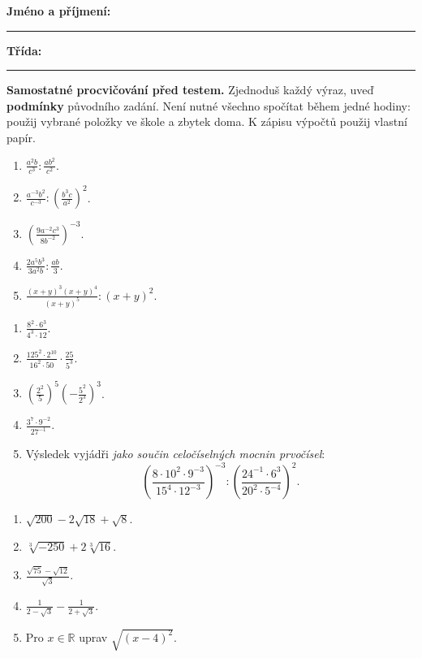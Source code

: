 \documentclass[11pt,a4paper]{article}
\begin{document}
\textbf{Jméno a příjmení:}\ \rule{7cm}{0.3pt}\hfill
\textbf{Třída:}\ \rule{2.1cm}{0.3pt}

\textbf{Samostatné procvičování před testem.}
Zjednoduš každý výraz, uveď \textbf{podmínky} původního zadání.
Není nutné všechno spočítat během jedné hodiny: použij vybrané
položky ve škole a zbytek doma. K zápisu výpočtů použij vlastní papír.

\begin{enumerate}[label=\textbf{\arabic*.},leftmargin=10mm]
\item $\displaystyle\frac{a^2b}{c^3}:\frac{ab^2}{c^2}$.
\item $\displaystyle\frac{a^{-3}b^2}{c^{-3}}:\left(\frac{b^3c}{a^2}\right)^2$.
\item $\displaystyle\left(\frac{9a^{-2}c^3}{8b^{-2}}\right)^{-3}$.
\item $\displaystyle\frac{2a^5b^3}{3a^2b}:\frac{ab}3$.
\item $\displaystyle\frac{(x+y)^3(x+y)^4}{(x+y)^5}:(x+y)^2$.
\end{enumerate}

\begin{enumerate}[label=\textbf{\arabic*.},leftmargin=10mm,start=6]
\item $\displaystyle\frac{8^2\cdot6^3}{4^3\cdot12}$.
\item $\displaystyle\frac{125^2\cdot2^{10}}{16^2\cdot50}\cdot\frac{25}{5^3}$.
\item $\displaystyle\left(\frac{2^2}{5}\right)^5\left(-\frac{5^2}{2^3}\right)^3$.
\item $\displaystyle\frac{3^7\cdot9^{-2}}{27^{-1}}$.
\item Výsledek vyjádři \emph{jako součin celočíselných mocnin prvočísel}:
\[
\left(\frac{8\cdot10^2\cdot9^{-3}}{15^4\cdot12^{-3}}\right)^{-3}
:\left(\frac{24^{-1}\cdot6^3}{20^2\cdot5^{-4}}\right)^2.
\]
\end{enumerate}

\begin{enumerate}[label=\textbf{\arabic*.},leftmargin=10mm,start=11]
\item $\sqrt{200}-2\sqrt{18}+\sqrt8$.
\item $\sqrt[3]{-250}+2\sqrt[3]{16}$.
\item $\displaystyle\frac{\sqrt{75}-\sqrt{12}}{\sqrt3}$.
\item $\displaystyle\frac1{2-\sqrt3}-\frac1{2+\sqrt3}$.
\item Pro $x\in\mathbb R$ uprav $\sqrt{(x-4)^2}$.
\end{enumerate}
\end{document}
